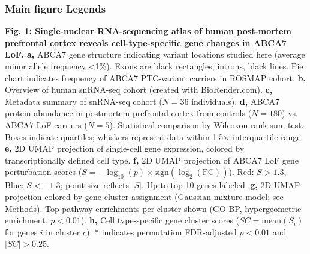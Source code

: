 \subsubsection{Main figure Legends}
\textbf{Fig. 1: Single-nuclear RNA-sequencing atlas of human post-mortem prefrontal cortex reveals cell-type-specific gene changes in ABCA7 LoF.}\newline  %
\textbf{a,} ABCA7 gene structure indicating variant locations studied here (average minor allele frequency <1\%). Exons are black rectangles; introns, black lines. Pie chart indicates frequency of ABCA7 PTC-variant carriers in ROSMAP cohort.
\textbf{b,} Overview of human snRNA-seq cohort (created with BioRender.com).
\textbf{c,} Metadata summary of snRNA-seq cohort ($N=36$ individuals).
\textbf{d,} ABCA7 protein abundance in postmortem prefrontal cortex from controls ($N=180$) vs. ABCA7 LoF carriers ($N=5$). Statistical comparison by Wilcoxon rank sum test. Boxes indicate quartiles; whiskers represent data within 1.5× interquartile range.
\textbf{e,} 2D UMAP projection of single-cell gene expression, colored by transcriptionally defined cell type.
\textbf{f,} 2D UMAP projection of ABCA7 LoF gene perturbation scores ($S = -\log_{10}(p)\times\text{sign}(\log_2(\text{FC}))$). Red: $S>1.3$, Blue: $S<-1.3$; point size reflects $|S|$. Up to top 10 genes labeled.
\textbf{g,} 2D UMAP projection colored by gene cluster assignment (Gaussian mixture model; see Methods). Top pathway enrichments per cluster shown (GO BP, hypergeometric enrichment, $p<0.01$).
\textbf{h,} Cell type-specific gene cluster scores ($SC=\text{mean}(S_i)$ for genes $i$ in cluster $c$). * indicates permutation FDR-adjusted $p<0.01$ and $|SC|>0.25$.

